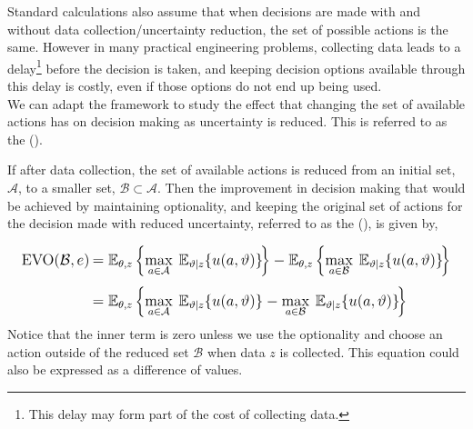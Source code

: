 
Standard  calculations also assume that when decisions are made with and without data collection/uncertainty reduction, the set of possible actions is the same. However in many practical engineering problems, collecting data leads to a delay\footnote{This delay may form part of the cost of collecting data.} before the decision is taken, and keeping decision options available through this delay is costly, even if those options do not end up being used.\\

We can adapt the  framework to study the effect that changing the set of available actions has on decision making as uncertainty is reduced. This is referred to as the  ().

If after data collection, the set of available actions is reduced from an initial set, $\mathcal{A}$, to a smaller set, $\mathcal{B} \subset \mathcal{A}$. Then the improvement in decision making that would be achieved by maintaining optionality, and keeping the original set of actions for the decision made with reduced uncertainty, referred to as the  (), is given by,

\begin{align}
\begin{split} \label{eq:methodology-voo}
    \mathlarger{\text{EVO}(\mathcal{B},e)} \:
    &\mathlarger{
        = \mathbb{E}_{\theta,z} \left\lbrace \max_{a \in \mathcal{A}} \: \mathbb{E}_{\vartheta|z}\lbrace u(a,\vartheta) \rbrace \!\right\rbrace - \mathbb{E}_{\theta,z} \left\lbrace \max_{a \in \mathcal{B}} \: \mathbb{E}_{\vartheta|z}\lbrace u(a,\vartheta) \rbrace \!\right\rbrace
    }\\[1ex]
    &\mathlarger{
        = \mathbb{E}_{\theta,z} \left\lbrace \max_{a \in \mathcal{A}} \: \mathbb{E}_{\vartheta|z}\lbrace u(a,\vartheta) \rbrace - \max_{a \in \mathcal{B}} \: \mathbb{E}_{\vartheta|z}\lbrace u(a,\vartheta) \rbrace \!\right\rbrace
    }
\end{split}
\end{align}
Notice that the inner term is zero unless we use the optionality and choose an action outside of the reduced set $\mathcal{B}$ when data $z$ is collected. This equation could also be expressed as a difference of  values.\\

